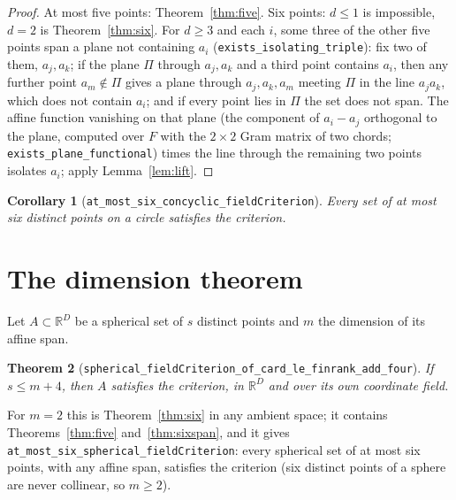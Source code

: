 \documentclass[11pt]{article}
\newtheorem{theorem}{Theorem}
\newtheorem{corollary}[theorem]{Corollary}
\theoremstyle{definition}
\theoremstyle{remark}
\newcommand{\R}{\mathbb{R}}
\begin{document}
\begin{proof}
At most five points: Theorem~\ref{thm:five}. Six points: $d \leq 1$ is impossible, $d = 2$ is
Theorem~\ref{thm:six}. For $d \geq 3$ and each $i$, some three of the other five points span a plane
not containing $a_i$ (\texttt{exists\_isolating\_triple}): fix two of them, $a_j, a_k$; if the plane
$\Pi$ through $a_j, a_k$ and a third point contains $a_i$, then any further point $a_m \notin \Pi$ gives
a plane through $a_j, a_k, a_m$ meeting $\Pi$ in the line $a_j a_k$, which does not contain $a_i$; and
if every point lies in $\Pi$ the set does not span. The affine function vanishing on that plane
(the component of $a_i - a_j$ orthogonal to the plane, computed over $F$ with the $2 \times 2$ Gram
matrix of two chords; \texttt{exists\_plane\_functional}) times the line through the remaining two
points isolates $a_i$; apply Lemma~\ref{lem:lift}.
\end{proof}

\begin{corollary}[\texttt{at\_most\_six\_concyclic\_fieldCriterion}]
Every set of at most six distinct points on a circle satisfies the criterion.
\end{corollary}

\section{The dimension theorem}\label{sec:dim}

Let $A \subset \R^D$ be a spherical set of $s$ distinct points and $m$ the dimension of its affine span.

\begin{theorem}[\texttt{spherical\_fieldCriterion\_of\_card\_le\_finrank\_add\_four}]\label{thm:dim}
If $s \leq m + 4$, then $A$ satisfies the criterion, in $\R^D$ and over its own coordinate field.
\end{theorem}

For $m = 2$ this is Theorem~\ref{thm:six} in any ambient space; it contains
Theorems~\ref{thm:five} and~\ref{thm:sixspan}, and it gives
\texttt{at\_most\_six\_spherical\_fieldCriterion}: every spherical set of at most six points, with any
affine span, satisfies the criterion (six distinct points of a sphere are never collinear, so
$m \geq 2$).
\end{document}
